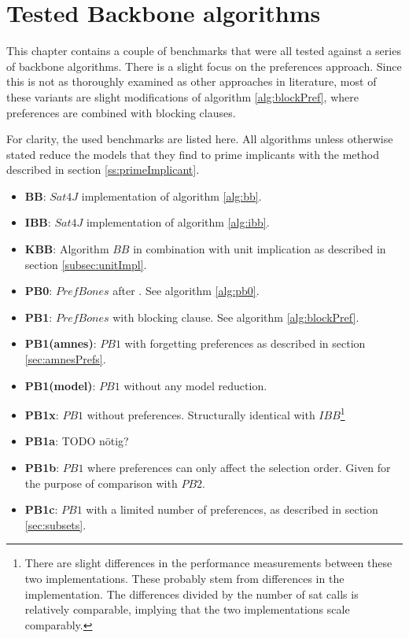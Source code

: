 \section{Tested Backbone algorithms}

This chapter contains a couple of benchmarks that were all tested against a series of backbone algorithms. There is a slight focus on the preferences approach. Since this is not as thoroughly examined as other approaches in literature, most of these variants are slight modifications of algorithm \ref{alg:blockPref}, where preferences are combined with blocking clauses.

For clarity, the used benchmarks are listed here. All algorithms unless otherwise stated reduce the models that they find to prime implicants with the method described in section \ref{ss:primeImplicant}.
\begin{itemize}
\item \textbf{BB}: $Sat4J$ implementation of algorithm \ref{alg:bb}.
\item \textbf{IBB}: $Sat4J$ implementation of algorithm \ref{alg:ibb}.
\item \textbf{KBB}: Algorithm $BB$ in combination with unit implication as described in section \ref{subsec:unitImpl}. 
\item \textbf{PB0}: $PrefBones$ after \cite{PJ18}. See algorithm \ref{alg:pb0}.
\item \textbf{PB1}: $PrefBones$ with blocking clause. See algorithm \ref{alg:blockPref}.
\item \textbf{PB1(amnes)}: $PB1$ with forgetting preferences as described in section \ref{sec:amnesPrefs}.
\item \textbf{PB1(model)}: $PB1$ without any model reduction.
\item \textbf{PB1x}: $PB1$ without preferences. Structurally identical with $IBB$\footnote{There are slight differences in the performance measurements between these two implementations. These probably stem from differences in the implementation. The differences divided by the number of sat calls is relatively comparable, implying that the two implementations scale comparably.}
\item \textbf{PB1a}: TODO nötig?
\item \textbf{PB1b}: $PB1$ where preferences can only affect the selection order. Given for the purpose of comparison with $PB2$.
\item \textbf{PB1c}: $PB1$ with a limited number of preferences, as described in section \ref{sec:subsets}.

\end{itemize}
